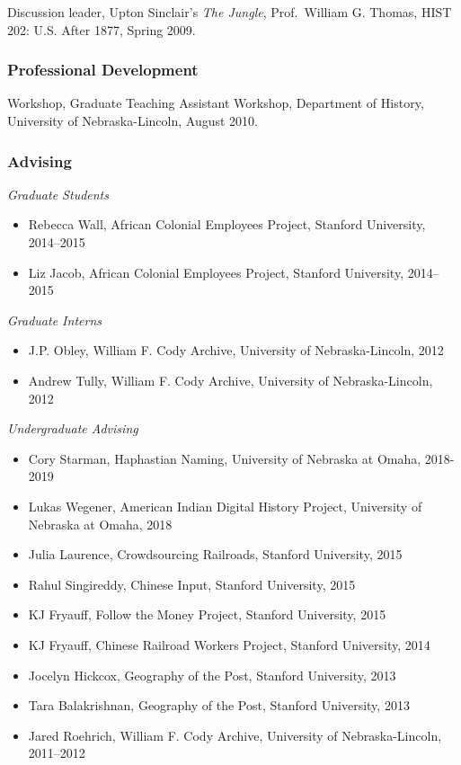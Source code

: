 Discussion leader, Upton Sinclair's \emph{The Jungle}, Prof.~William G.
Thomas, HIST 202: U.S. After 1877, Spring 2009.

\subsubsection{Professional
Development}\label{professional-development-1}

Workshop, Graduate Teaching Assistant Workshop, Department of History,
University of Nebraska-Lincoln, August 2010.

\subsubsection{Advising}\label{advising}

\emph{Graduate Students}

\begin{itemize}
\tightlist
\item
  Rebecca Wall, African Colonial Employees Project, Stanford University,
  2014--2015
\item
  Liz Jacob, African Colonial Employees Project, Stanford University,
  2014--2015
\end{itemize}

\emph{Graduate Interns}

\begin{itemize}
\tightlist
\item
  J.P. Obley, William F. Cody Archive, University of Nebraska-Lincoln,
  2012
\item
  Andrew Tully, William F. Cody Archive, University of Nebraska-Lincoln,
  2012
\end{itemize}

\emph{Undergraduate Advising}

\begin{itemize}
\tightlist
\item
  Cory Starman, Haphastian Naming, University of Nebraska at Omaha,
  2018-2019
\item
  Lukas Wegener, American Indian Digital History Project, University of
  Nebraska at Omaha, 2018
\item
  Julia Laurence, Crowdsourcing Railroads, Stanford University, 2015
\item
  Rahul Singireddy, Chinese Input, Stanford University, 2015
\item
  KJ Fryauff, Follow the Money Project, Stanford University, 2015
\item
  KJ Fryauff, Chinese Railroad Workers Project, Stanford University,
  2014
\item
  Jocelyn Hickcox, Geography of the Post, Stanford University, 2013
\item
  Tara Balakrishnan, Geography of the Post, Stanford University, 2013
\item
  Jared Roehrich, William F. Cody Archive, University of
  Nebraska-Lincoln, 2011--2012
\end{itemize}

